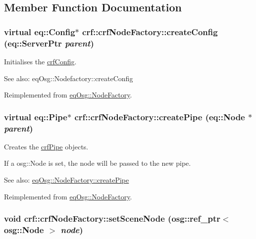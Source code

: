 \subsection{Member Function Documentation}
\hypertarget{a00005_0b7b562ae3d0ccc5a98017195926057f}{
\subsubsection[{createConfig}]{\setlength{\rightskip}{0pt plus 5cm}virtual eq::Config$\ast$ crf::crfNodeFactory::createConfig (eq::ServerPtr {\em parent})}}
\label{a00005_0b7b562ae3d0ccc5a98017195926057f}


Initialises the \hyperlink{a00004}{crfConfig}. 

\begin{Desc}
\item[See also:]eqOsg::Nodefactory::createConfig \end{Desc}


Reimplemented from \hyperlink{a00013_0e80614084de6b23a4a2677fc8af7f93}{eqOsg::NodeFactory}.\hypertarget{a00005_5f35c307f323b385869226c6083df93d}{
\subsubsection[{createPipe}]{\setlength{\rightskip}{0pt plus 5cm}virtual eq::Pipe$\ast$ crf::crfNodeFactory::createPipe (eq::Node $\ast$ {\em parent})}}
\label{a00005_5f35c307f323b385869226c6083df93d}


Creates the \hyperlink{a00006}{crfPipe} objects. 

If a osg::Node is set, the node will be passed to the new pipe. \begin{Desc}
\item[See also:]\hyperlink{a00013_10e06f5d0d32f146994274682d39e666}{eqOsg::NodeFactory::createPipe} \end{Desc}


Reimplemented from \hyperlink{a00013_10e06f5d0d32f146994274682d39e666}{eqOsg::NodeFactory}.\hypertarget{a00005_52740ca913279f9cbdfc4a10f55b691d}{
\subsubsection[{setSceneNode}]{\setlength{\rightskip}{0pt plus 5cm}void crf::crfNodeFactory::setSceneNode (osg::ref\_\-ptr$<$ osg::Node $>$ {\em node})}}
\label{a00005_52740ca913279f9cbdfc4a10f55b691d}


